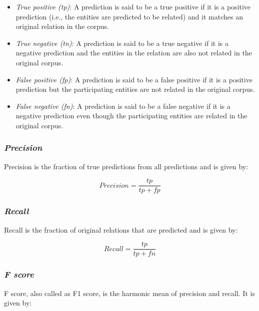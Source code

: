 \begin{itemize}

\item \textit{True positive (tp)}: A prediction is said to be a true positive if it is a positive prediction (i.e., the entities are predicted to be related) and it matches an original relation in the corpus.

\item \textit{True negative (tn)}: A prediction is said to be a true negative if it is a negative prediction and the entities in the relation are also not related in the original corpus.

\item \textit{False positive (fp)}: A prediction is said to be a false positive if it is a positive prediction but the participating entities are not related in the original corpus.

\item \textit{False negative (fn)}: A prediction is said to be a false negative if it is a negative prediction even though the participating entities are related in the original corpus.

\end{itemize}

\subsubsection*{\textit{Precision}}\label{subsubsec:Prec}

Precision is the fraction of true predictions from all predictions and is given by:

$$
\textit{Precision} = \frac{tp}{tp+fp}
$$


\subsubsection*{\textit{Recall}}\label{subsubsec:Recal}

Recall is the fraction of original relations that are predicted and is given by:

$$
\textit{Recall} = \frac{tp}{tp+fn}
$$

\subsubsection*{\textit{F score}}\label{subsubsec:Fscore}

F score, also called as F1 score, is the harmonic mean of precision and recall. It is given by:


